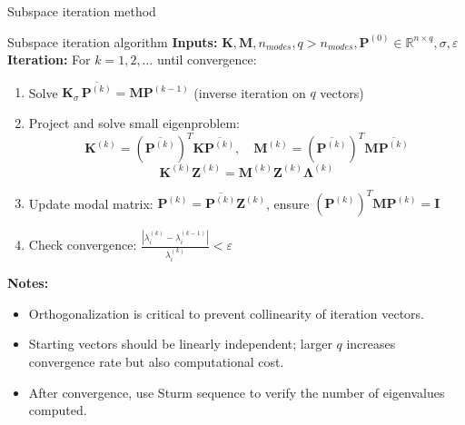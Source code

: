 \documentclass[aspectratio=169]{beamer}
\begin{document}
{\begin{frame}{Subspace iteration method}
\begin{center}
  \end{center}
\end{frame}

\begin{frame}{Subspace iteration algorithm}
  \small
  \textbf{Inputs:} \(\mathbf K, \mathbf M, n_{modes}, q>n_{modes}, \mathbf P^{(0)}\in \mathbb{R}^{n\times q}, \sigma, \varepsilon\)\\[1mm]

  \textbf{Iteration:} For \(k=1,2,\dots\) until convergence:
  \begin{enumerate}
    \item Solve \( \mathbf K_\sigma \, \overline{\mathbf P^{(k)}} = \mathbf M \mathbf P^{(k-1)} \) (inverse iteration on \(q\) vectors)
    \item Project and solve small eigenproblem:
          \[
            \mathbf K^{(k)} = (\overline{\mathbf P^{(k)}})^T \mathbf K \overline{\mathbf P^{(k)}}, \quad
            \mathbf M^{(k)} = (\overline{\mathbf P^{(k)}})^T \mathbf M \overline{\mathbf P^{(k)}}
          \]
          \[
            \mathbf K^{(k)} \mathbf Z^{(k)} = \mathbf M^{(k)} \mathbf Z^{(k)} \mathbf \Lambda^{(k)}
          \]
    \item Update modal matrix: \( \mathbf P^{(k)} = \overline{\mathbf P^{(k)}} \mathbf Z^{(k)} \), ensure \( (\mathbf P^{(k)})^T \mathbf M \mathbf P^{(k)} = \mathbf I \)
    \item Check convergence: \( \frac{|\lambda_i^{(k)} - \lambda_i^{(k-1)}|}{\lambda_i^{(k)}} < \varepsilon \)
  \end{enumerate}

  \textbf{Notes:}
  \begin{itemize}
    \item Orthogonalization is critical to prevent collinearity of iteration vectors.
    \item Starting vectors should be linearly independent; larger \(q\) increases convergence rate but also computational cost.
    \item After convergence, use Sturm sequence to verify the number of eigenvalues computed.
  \end{itemize}
\end{frame}


}
\end{document}
